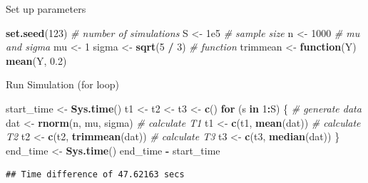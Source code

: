 \documentclass[
  ignorenonframetext,
]{beamer}
\newenvironment{Shaded}{\begin{snugshade}}{\end{snugshade}}
\newcommand{\CommentTok}[1]{\textcolor[rgb]{0.56,0.35,0.01}{\textit{#1}}}
\newcommand{\ControlFlowTok}[1]{\textcolor[rgb]{0.13,0.29,0.53}{\textbf{#1}}}
\newcommand{\DecValTok}[1]{\textcolor[rgb]{0.00,0.00,0.81}{#1}}
\newcommand{\FloatTok}[1]{\textcolor[rgb]{0.00,0.00,0.81}{#1}}
\newcommand{\FunctionTok}[1]{\textcolor[rgb]{0.13,0.29,0.53}{\textbf{#1}}}
\newcommand{\NormalTok}[1]{#1}
\newcommand{\OtherTok}[1]{\textcolor[rgb]{0.56,0.35,0.01}{#1}}
\newcommand{\SpecialCharTok}[1]{\textcolor[rgb]{0.81,0.36,0.00}{\textbf{#1}}}
\begin{document}
\begin{frame}[fragile]{Set up parameters}
\protect{}\label{set-up-parameters}
\begin{Shaded}
\begin{Highlighting}[]
\FunctionTok{set.seed}\NormalTok{(}\DecValTok{123}\NormalTok{)}
\CommentTok{\# number of simulations}
\NormalTok{S }\OtherTok{\textless{}{-}} \FloatTok{1e5}
\CommentTok{\# sample size}
\NormalTok{n }\OtherTok{\textless{}{-}} \DecValTok{1000}
\CommentTok{\# mu and sigma}
\NormalTok{mu }\OtherTok{\textless{}{-}} \DecValTok{1}
\NormalTok{sigma }\OtherTok{\textless{}{-}} \FunctionTok{sqrt}\NormalTok{(}\DecValTok{5} \SpecialCharTok{/} \DecValTok{3}\NormalTok{)}
\CommentTok{\# function}
\NormalTok{trimmean }\OtherTok{\textless{}{-}} \ControlFlowTok{function}\NormalTok{(Y) }\FunctionTok{mean}\NormalTok{(Y, }\FloatTok{0.2}\NormalTok{)}
\end{Highlighting}
\end{Shaded}
\end{frame}

\begin{frame}[fragile]{Run Simulation (for loop)}
\protect{}\label{run-simulation-for-loop}
\begin{Shaded}
\begin{Highlighting}[]
\NormalTok{start\_time }\OtherTok{\textless{}{-}} \FunctionTok{Sys.time}\NormalTok{()}
\NormalTok{t1 }\OtherTok{\textless{}{-}}\NormalTok{ t2 }\OtherTok{\textless{}{-}}\NormalTok{ t3 }\OtherTok{\textless{}{-}} \FunctionTok{c}\NormalTok{()}
\ControlFlowTok{for}\NormalTok{ (s }\ControlFlowTok{in} \DecValTok{1}\SpecialCharTok{:}\NormalTok{S) \{}
  \CommentTok{\# generate data}
\NormalTok{  dat }\OtherTok{\textless{}{-}} \FunctionTok{rnorm}\NormalTok{(n, mu, sigma)}
  \CommentTok{\# calculate T1}
\NormalTok{  t1 }\OtherTok{\textless{}{-}} \FunctionTok{c}\NormalTok{(t1, }\FunctionTok{mean}\NormalTok{(dat))}
  \CommentTok{\# calculate T2}
\NormalTok{  t2 }\OtherTok{\textless{}{-}} \FunctionTok{c}\NormalTok{(t2, }\FunctionTok{trimmean}\NormalTok{(dat))}
  \CommentTok{\# calculate T3}
\NormalTok{  t3 }\OtherTok{\textless{}{-}} \FunctionTok{c}\NormalTok{(t3, }\FunctionTok{median}\NormalTok{(dat))}
\NormalTok{\}}
\NormalTok{end\_time }\OtherTok{\textless{}{-}} \FunctionTok{Sys.time}\NormalTok{()}
\NormalTok{end\_time }\SpecialCharTok{{-}}\NormalTok{ start\_time}
\end{Highlighting}
\end{Shaded}

\begin{verbatim}
## Time difference of 47.62163 secs
\end{verbatim}
\end{frame}
\end{document}
